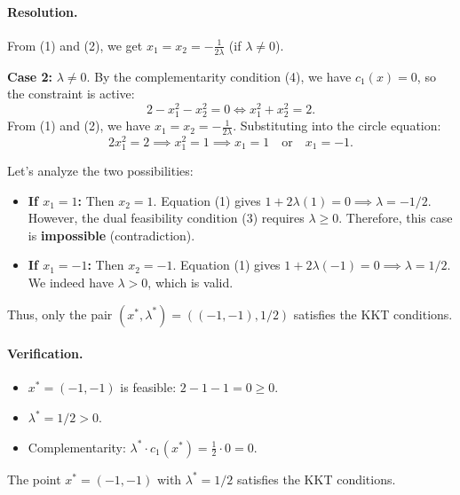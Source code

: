 \begin{exemple}
    \paragraph{Resolution.}
    From (1) and (2), we get $x_1 = x_2 = -\frac{1}{2\lambda}$ (if $\lambda \neq 0$).
    
    \textbf{Case 2:} $\lambda \neq 0$.
    By the complementarity condition (4), we have $c_1(x) = 0$, so the constraint is active:
    \begin{equation}
        2 - x_1^2 - x_2^2 = 0 \iff x_1^2 + x_2^2 = 2.
    \end{equation}
    From (1) and (2), we have $x_1 = x_2 = -\frac{1}{2\lambda}$.
    Substituting into the circle equation:
    \begin{equation}
        2 x_1^2 = 2 \implies x_1^2 = 1 \implies x_1 = 1 \quad \text{or} \quad x_1 = -1.
    \end{equation}
    
    Let's analyze the two possibilities:
    \begin{itemize}
        \item \textbf{If $x_1 = 1$:} Then $x_2 = 1$. Equation (1) gives $1 + 2\lambda(1) = 0 \implies \lambda = -1/2$.
        However, the dual feasibility condition (3) requires $\lambda \geq 0$.
        Therefore, this case is \textbf{impossible} (contradiction).
        
        \item \textbf{If $x_1 = -1$:} Then $x_2 = -1$. Equation (1) gives $1 + 2\lambda(-1) = 0 \implies \lambda = 1/2$.
        We indeed have $\lambda > 0$, which is valid.
    \end{itemize}
    
    Thus, only the pair $(x^*, \lambda^*) = ((-1, -1), 1/2)$ satisfies the KKT conditions.
    
    \paragraph{Verification.}
    \begin{itemize}
        \item $x^* = (-1, -1)$ is feasible: $2 - 1 - 1 = 0 \geq 0$. \checkmark
        \item $\lambda^* = 1/2 > 0$. \checkmark
        \item Complementarity: $\lambda^* \cdot c_1(x^*) = \frac{1}{2} \cdot 0 = 0$. \checkmark
    \end{itemize}
    
    The point $x^* = (-1, -1)$ with $\lambda^* = 1/2$ satisfies the KKT conditions.
    

\end{exemple}
